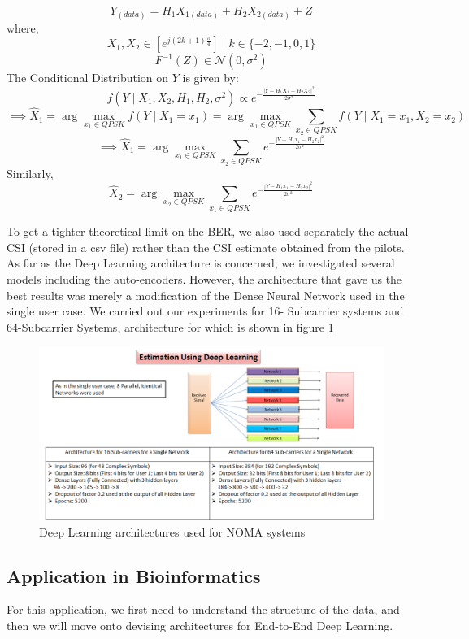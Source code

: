 $$Y_{(data)}=H_1X_{1(data)}+H_2X_{2(data)}+Z$$
where,\\
$$X_1,X_2\in[e^{j(2k+1)\frac{\pi}{4}}] \mid k\in\{-2,-1,0,1\}$$
$$F^{-1}(Z)\in \mathcal{N}(0,\sigma^2)$$
The Conditional Distribution on $Y$ is given by:\\
$$f(Y\mid X_1,X_2,H_1,H_2,\sigma^2)\propto e^{-\frac{|Y-H_1X_1-H_2X_2|^2}{2\sigma^2}}$$
$$\implies \hat{X}_1 = \arg \max_{x_1\in QPSK}f(Y\mid X_1=x_1)=\arg \max_{x_1\in QPSK}\sum_{x_2\in QPSK}f(Y\mid X_1=x_1,X_2=x_2)$$
$$\implies \hat{X}_1 = \arg \max_{x_1\in QPSK}\sum_{x_2\in QPSK}e^{-\frac{|Y-H_1x_1-H_2x_2|^2}{2\sigma^2}}$$
Similarly,\\
$$\hat{X}_2 = \arg \max_{x_2\in QPSK}\sum_{x_1\in QPSK}e^{-\frac{|Y-H_1x_1-H_2x_2|^2}{2\sigma^2}}$$

To get a tighter theoretical limit on the BER, we also used separately the actual CSI (stored in a csv file) rather than the CSI estimate obtained from the pilots. \\
As far as the Deep Learning architecture is concerned, we investigated several models including the auto-encoders. However, the architecture that gave us the best results was merely a modification of the Dense Neural Network used in the single user case. We carried out our experiments for 16- Subcarrier systems and 64-Subcarrier Systems, architecture for which is shown in figure \ref{fig:comm_nomaarch}
\begin{figure}[htbp]
  \centering
  \includegraphics[width=\textwidth]{./Figures/comm_nomaarch.png}
  \caption{Deep Learning architectures used for NOMA systems}
  \label{fig:comm_nomaarch}
\end{figure}
\subsection{Application in Bioinformatics}
For this application, we first need to understand the structure of the data, and then we will move onto devising architectures for End-to-End Deep Learning. 
